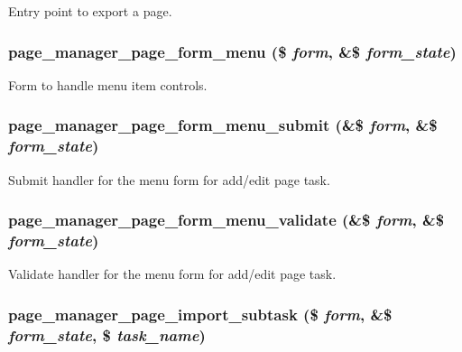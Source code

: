 \label{page_8admin_8inc_a23e5e221703cba1aa7a7c45d134537a9}
Entry point to export a page. \hypertarget{page_8admin_8inc_a97c1e9b03b6b308a3aeaea9e98da2cb6}{
\subsubsection[{page\_\-manager\_\-page\_\-form\_\-menu}]{\setlength{\rightskip}{0pt plus 5cm}page\_\-manager\_\-page\_\-form\_\-menu (\$ {\em form}, \/  \&\$ {\em form\_\-state})}}
\label{page_8admin_8inc_a97c1e9b03b6b308a3aeaea9e98da2cb6}
Form to handle menu item controls. \hypertarget{page_8admin_8inc_ac33beb928f40fba9cbfe4f02851ce9db}{
\subsubsection[{page\_\-manager\_\-page\_\-form\_\-menu\_\-submit}]{\setlength{\rightskip}{0pt plus 5cm}page\_\-manager\_\-page\_\-form\_\-menu\_\-submit (\&\$ {\em form}, \/  \&\$ {\em form\_\-state})}}
\label{page_8admin_8inc_ac33beb928f40fba9cbfe4f02851ce9db}
Submit handler for the menu form for add/edit page task. \hypertarget{page_8admin_8inc_af53e1248d62ab656dce705747d9c4523}{
\subsubsection[{page\_\-manager\_\-page\_\-form\_\-menu\_\-validate}]{\setlength{\rightskip}{0pt plus 5cm}page\_\-manager\_\-page\_\-form\_\-menu\_\-validate (\&\$ {\em form}, \/  \&\$ {\em form\_\-state})}}
\label{page_8admin_8inc_af53e1248d62ab656dce705747d9c4523}
Validate handler for the menu form for add/edit page task. \hypertarget{page_8admin_8inc_a506bcc1dfa1fd86e2cfe581842e54e30}{
\subsubsection[{page\_\-manager\_\-page\_\-import\_\-subtask}]{\setlength{\rightskip}{0pt plus 5cm}page\_\-manager\_\-page\_\-import\_\-subtask (\$ {\em form}, \/  \&\$ {\em form\_\-state}, \/  \$ {\em task\_\-name})}}
